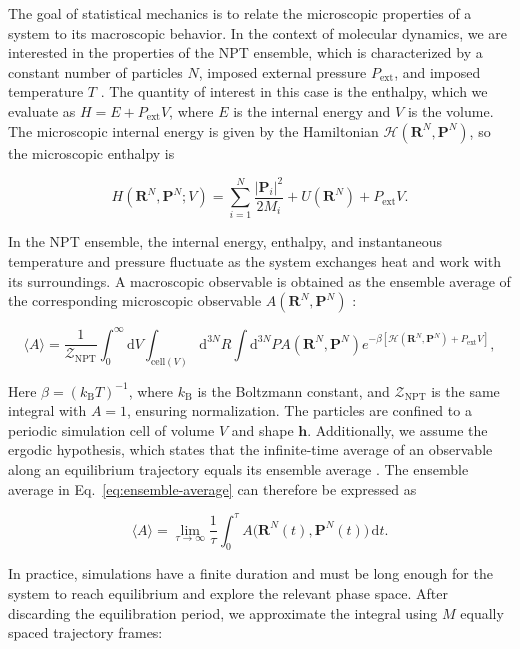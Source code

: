 \documentclass[12pt,a4paper]{article}
\numberwithin{equation}{section}
\begin{document}
The goal of statistical mechanics is to relate the microscopic properties of a system to its macroscopic behavior.
In the context of molecular dynamics, we are interested in the properties of the NPT ensemble,
which is characterized by a constant number of particles $N$, imposed external pressure $P_{\mathrm{ext}}$, and imposed temperature $T$ \cite{tuckerman2023}.
The quantity of interest in this case is the enthalpy,
which we evaluate as $H=E+P_{\mathrm{ext}}V$, where $E$ is the internal energy and $V$ is the volume.
The microscopic internal energy is given by the Hamiltonian $\mathcal{H}(\bm R^N,\bm P^N)$, so the microscopic enthalpy is

\begin{equation}
  H(\bm R^N,\bm P^N;V)=\sum_{i=1}^{N}\frac{|\bm P_i|^2}{2M_i}+U(\bm R^N)+P_{\mathrm{ext}}V.
  \label{eq:physical-enthalpy}
\end{equation}

In the NPT ensemble, the internal energy, enthalpy, and instantaneous temperature and pressure fluctuate as the system exchanges heat and work with its surroundings.
A macroscopic observable is obtained as the ensemble average of the corresponding microscopic observable $A(\bm R^N,\bm P^N)$ \cite{kapil2019}:

\begin{equation}
  \langle A\rangle
    =\frac{1}{\mathcal Z_{\mathrm{NPT}}}\int_0^\infty\mathrm dV\int_{\mathrm{cell}(V)}\mathrm d^{3N}R\int\mathrm d^{3N}P
    A(\bm R^N,\bm P^N)e^{-\beta[\mathcal{H}(\bm R^N,\bm P^N)+P_{\mathrm{ext}}V]},
  \label{eq:ensemble-average}
\end{equation}

Here $\beta=(k_{\mathrm B}T)^{-1}$, where $k_{\mathrm B}$ is the Boltzmann constant,
and $\mathcal Z_{\mathrm{NPT}}$ is the same integral with $A=1$, ensuring normalization.
The particles are confined to a periodic simulation cell of volume $V$ and shape $\bm h$.
Additionally, we assume the ergodic hypothesis,
which states that the infinite-time average of an observable along an equilibrium trajectory equals its ensemble average \cite{tuckerman2023}.
The ensemble average in Eq.~\eqref{eq:ensemble-average} can therefore be expressed as

\begin{equation}
  \langle A\rangle=\lim_{\tau\to\infty}\frac{1}{\tau}\int_0^\tau A\bigl(\bm R^N(t),\bm P^N(t)\bigr)\,\mathrm dt.
  \label{eq:ergodic-average}
\end{equation}

In practice, simulations have a finite duration and must be long enough for the system to reach equilibrium and explore the relevant phase space.
After discarding the equilibration period, we approximate the integral using $M$ equally spaced trajectory frames:
\end{document}
